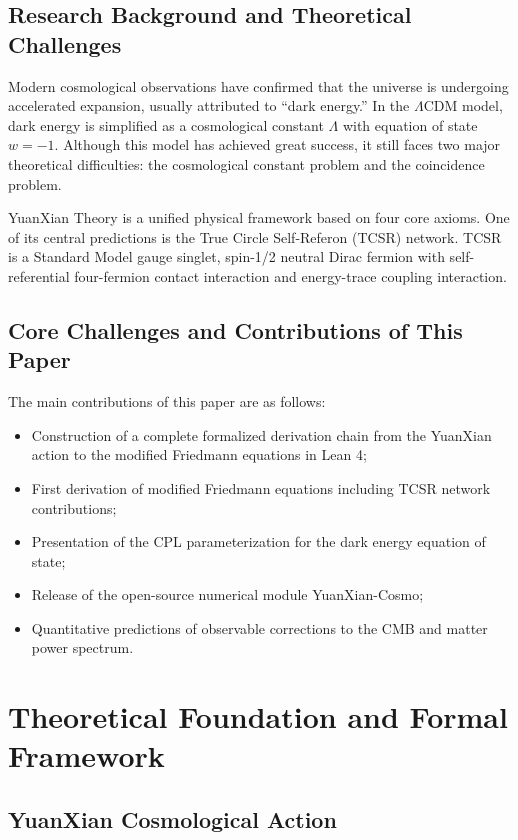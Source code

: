 \documentclass[12pt,a4paper]{article}
\begin{document}
\subsection{Research Background and Theoretical Challenges}

Modern cosmological observations have confirmed that the universe is undergoing accelerated expansion, usually attributed to “dark energy.” In the $\Lambda$CDM model, dark energy is simplified as a cosmological constant $\Lambda$ with equation of state $w=-1$. Although this model has achieved great success, it still faces two major theoretical difficulties: the cosmological constant problem and the coincidence problem.

YuanXian Theory is a unified physical framework based on four core axioms. One of its central predictions is the True Circle Self-Referon (TCSR) network. TCSR is a Standard Model gauge singlet, spin-1/2 neutral Dirac fermion with self-referential four-fermion contact interaction and energy-trace coupling interaction.

\subsection{Core Challenges and Contributions of This Paper}

The main contributions of this paper are as follows:
\begin{itemize}
    \item Construction of a complete formalized derivation chain from the YuanXian action to the modified Friedmann equations in Lean 4;
    \item First derivation of modified Friedmann equations including TCSR network contributions;
    \item Presentation of the CPL parameterization for the dark energy equation of state;
    \item Release of the open-source numerical module YuanXian-Cosmo;
    \item Quantitative predictions of observable corrections to the CMB and matter power spectrum.
\end{itemize}

\section{Theoretical Foundation and Formal Framework}

\subsection{YuanXian Cosmological Action}
\end{document}
